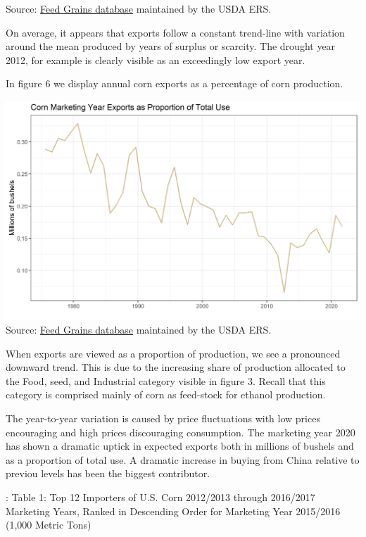 \documentclass[
  letterpaper,
  DIV=11,
  numbers=noendperiod]{scrreprt}
\begin{document}
Source:
\href{http://www.ers.usda.gov/data-products/feed-grains-database/feed-grains-yearbook-tables.aspx\#26780}{Feed
Grains database} maintained by the USDA ERS.

On average, it appears that exports follow a constant trend-line with
variation around the mean produced by years of surplus or scarcity. The
drought year 2012, for example is clearly visible as an exceedingly low
export year.

In figure 6 we display annual corn exports as a percentage of corn
production.

\includegraphics{assets/ForecastingUseof-CornUseCategoriesExportsPropofUse.png}
Source:
\href{http://www.ers.usda.gov/data-products/feed-grains-database/feed-grains-yearbook-tables.aspx\#26780}{Feed
Grains database} maintained by the USDA ERS.

When exports are viewed as a proportion of production, we see a
pronounced downward trend. This is due to the increasing share of
production allocated to the Food, seed, and Industrial category visible
in figure 3. Recall that this category is comprised mainly of corn as
feed-stock for ethanol production.

The year-to-year variation is caused by price fluctuations with low
prices encouraging and high prices discouraging consumption. The
marketing year 2020 has shown a dramatic uptick in expected exports both
in millions of bushels and as a proportion of total use. A dramatic
increase in buying from China relative to previou levels has been the
biggest contributor.

: Table 1: Top 12 Importers of U.S. Corn 2012/2013 through 2016/2017
Marketing Years, Ranked in Descending Order for Marketing Year 2015/2016
(1,000 Metric Tons)
\end{document}
